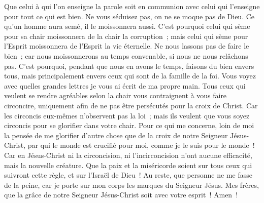 \begin{multicols}{2}
Que celui à qui l'on enseigne la parole soit en communion avec celui qui l'enseigne pour tout ce qui est bien.
Ne vous séduisez pas, on ne se moque pas de Dieu. Ce qu'un homme aura semé, il le moissonnera aussi.
C'est pourquoi celui qui sème pour sa chair moissonnera de la chair la corruption~; mais celui qui sème pour l'Esprit moissonnera de l'Esprit la vie éternelle.
Ne nous lassons pas de faire le bien~; car nous moissonnerons au temps convenable, si nous ne nous relâchons pas.
C'est pourquoi, pendant que nous en avons le temps, faisons du bien envers tous, mais principalement envers ceux qui sont de la famille de la foi.
Vous voyez avec quelles grandes lettres je vous ai écrit de ma propre main.
Tous ceux qui veulent se rendre agréables selon la chair vous contraignent à vous faire circoncire, uniquement afin de ne pas être persécutés pour la croix de Christ.
Car les circoncis eux-mêmes n'observent pas la loi~; mais ils veulent que vous soyez circoncis pour se glorifier dans votre chair.
Pour ce qui me concerne, loin de moi la pensée de me glorifier d'autre chose que de la croix de notre Seigneur Jésus-Christ, par qui le monde est crucifié pour moi, comme je le suis pour le monde~!
Car en Jésus-Christ ni la circoncision, ni l'incirconcision n'ont aucune efficacité, mais la nouvelle créature.
Que la paix et la miséricorde soient sur tous ceux qui suivront cette règle, et sur l'Israël de Dieu~!
Au reste, que personne ne me fasse de la peine, car je porte sur mon corps les marques du Seigneur Jésus.
Mes frères, que la grâce de notre Seigneur Jésus-Christ soit avec votre esprit~! Amen~!
\PPE{}
\end{multicols}
